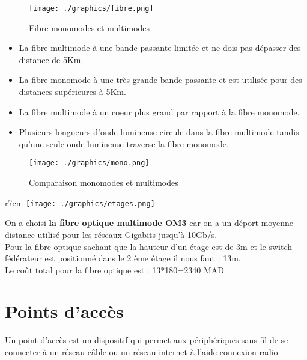 \documentclass[12pt,a4paper]{report}
\begin{document}
		\begin{figure}[!hbtp]
			\centering
			\texttt{[image: ./graphics/fibre.png]}
			\caption{Fibre monomodes et multimodes}
		\end{figure}

		\begin{itemize}
			\item La fibre multimode à une bande passante limitée et ne
dois pas dépasser des distance de 5Km.
			\item La fibre monomode à une très grande bande passante
et est utilisée pour des distances supérieures à 5Km.
			\item La fibre multimode à un coeur plus grand par rapport à
la fibre monomode.
			\item Plusieurs longueurs d’onde lumineuse circule dans la
fibre multimode tandis qu’une seule onde lumineuse
traverse la fibre monomode.
		\end{itemize}
		


		\begin{figure}[!hbtp]
			\centering
			\texttt{[image: ./graphics/mono.png]}
			\caption{Comparaison monomodes et multimodes}
		\end{figure}



		\begin{wrapfigure} {r}{7cm}
		\texttt{[image: ./graphics/etages.png]}
		\end{wrapfigure}
		On a choisi \textbf{la fibre optique multimode OM3} car on a un déport moyenne distance utilisé pour
les réseaux Gigabits jusqu’à 10Gb/s.\\
		\newline
		Pour la fibre optique sachant que la hauteur d’un étage est de 3m et le switch fédérateur est
positionné dans le 2 ème étage il nous faut : 13m.\\
		\newline
Le coût total pour la fibre optique est : 13*180=2340 MAD
		
		\section{Points d'accès}
		Un point d'accès est un dispositif qui permet aux périphériques sans fil de se connecter à un réseau câble ou un réseau internet à l'aide connexion radio.\\
		\newline
\end{document}
